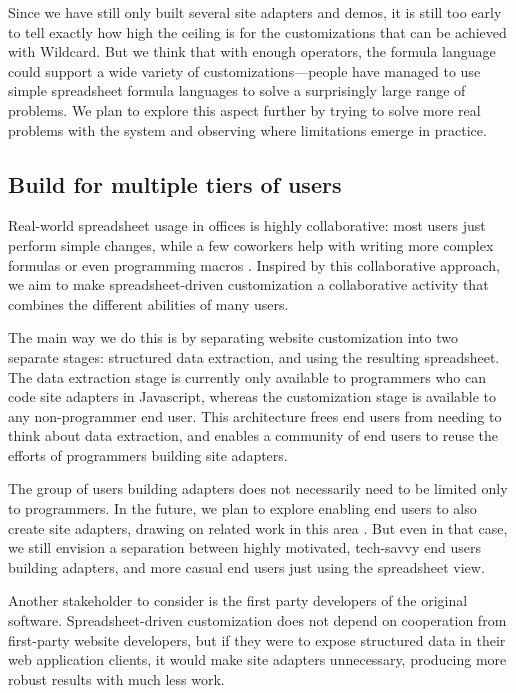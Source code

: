 \documentclass[english,submission]{programming}
\begin{document}
Since we have still only built several site adapters and demos, it is
still too early to tell exactly how high the ceiling is for the
customizations that can be achieved with Wildcard. But we think that
with enough operators, the formula language could support a wide variety
of customizations---people have managed to use simple spreadsheet
formula languages to solve a surprisingly large range of problems. We
plan to explore this aspect further by trying to solve more real
problems with the system and observing where limitations emerge in
practice.

\hypertarget{build-for-multiple-tiers-of-users}{%
\subsection{Build for multiple tiers of
users}\label{build-for-multiple-tiers-of-users}}

Real-world spreadsheet usage in offices is highly collaborative: most
users just perform simple changes, while a few coworkers help with
writing more complex formulas or even programming macros
\autocite{nardi1990}. Inspired by this collaborative approach, we aim to
make spreadsheet-driven customization a collaborative activity that
combines the different abilities of many users.

The main way we do this is by separating website customization into two
separate stages: structured data extraction, and using the resulting
spreadsheet. The data extraction stage is currently only available to
programmers who can code site adapters in Javascript, whereas the
customization stage is available to any non-programmer end user. This
architecture frees end users from needing to think about data
extraction, and enables a community of end users to reuse the efforts of
programmers building site adapters.

The group of users building adapters does not necessarily need to be
limited only to programmers. In the future, we plan to explore enabling
end users to also create site adapters, drawing on related work in this
area \autocite{chasins2018,huynh2006}. But even in that case, we still
envision a separation between highly motivated, tech-savvy end users
building adapters, and more casual end users just using the spreadsheet
view.

Another stakeholder to consider is the first party developers of the
original software. Spreadsheet-driven customization does not depend on
cooperation from first-party website developers, but if they were to
expose structured data in their web application clients, it would make
site adapters unnecessary, producing more robust results with much less
work.
\end{document}
